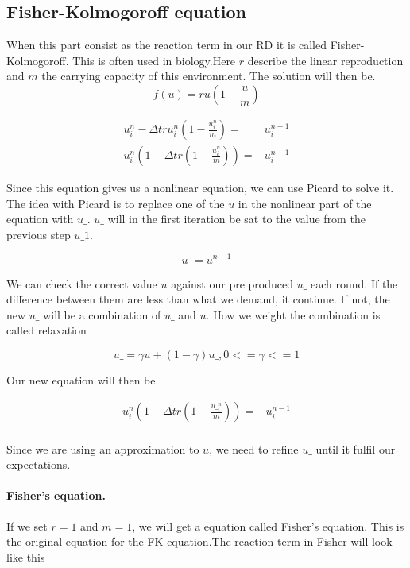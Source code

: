 \documentclass{book}
\begin{document}
\subsection{Fisher-Kolmogoroff equation}

When this part consist as the reaction term in our RD it is called Fisher-Kolmogoroff. This
is often used in biology.Here $r$ describe the linear reproduction and
$m$ the carrying capacity of this environment. The solution
will then be.
\begin{equation}
f(u) = ru(1-\frac{u}{m})
\end{equation}


\begin{align*}
u^n_i-\Delta t ru^n_i(1-\frac{u^n_i}{m}) =& u^{n-1}_i\\
u^n_i(1-\Delta t r(1-\frac{u^n_i}{m})) =& u^{n-1}_i
\end{align*}

Since this equation gives us a nonlinear equation, we can use Picard to solve
it. The idea with Picard is to replace one of the $u$ in the nonlinear part of the equation with $u\_$. $u\_$ will in the first
iteration be sat to the value from the previous step $u\_1$. 

\begin{equation*}
	u\_ = u^{n-1}
\end{equation*}

We can check the correct value $u$ against our pre produced $u\_$ each round. If the difference between
them are less than what we demand, it continue. If not, the new $u\_$ will be a combination of $u\_$ and $u$. How we weight the combination is called relaxation 

\begin{equation*}
u\_ = \gamma u + (1-\gamma)u\_, 0<= \gamma <=1
\end{equation*}

Our new equation will then be

\begin{align*}
	u^n_i(1- \Delta t r(1-\frac{u\__i^n}{m}))=& u^{n-1}_i\\
\end{align*}

Since we are using an approximation to $u$, we need to refine $u\_$ until it
fulfil our expectations.

\paragraph{Fisher's equation.}
If we set $r=1$ and $m=1$, we will get a equation called Fisher's equation. This is the
original equation for the FK equation.The reaction term in Fisher will look like this
\end{document}
